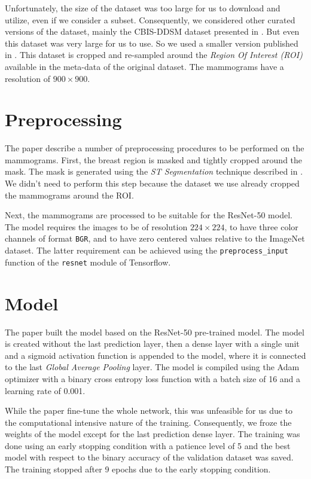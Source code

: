 \documentclass[twocolumn]{article}
\begin{document}
Unfortunately, the size of the dataset was too large for us to download and
utilize, even if we consider a subset. Consequently, we considered other curated
versions of the dataset, mainly the CBIS-DDSM dataset presented in
\autocite{Lee2017}. But even this dataset was very large for us to use. So we
used a smaller version published in \autocite{Luka2020}. This dataset is cropped
and re-sampled around the \emph{Region Of Interest (ROI)} available in the
meta-data of the original dataset. The mammograms have a resolution of $900
\times 900$.

\section{Preprocessing}

The paper describe a number of preprocessing procedures to be performed on the
mammograms. First, the breast region is masked and tightly cropped around the
mask. The mask is generated using the \emph{ST Segmentation} technique described
in \autocite{Pertuz2014}. We didn't need to perform this step because the
dataset we use already cropped the mammograms around the ROI.

Next, the mammograms are processed to be suitable for the ResNet-50 model. The
model requires the images to be of resolution $224 \times 224$, to have three
color channels of format \texttt{BGR}, and to have zero centered values relative
to the ImageNet dataset. The latter requirement can be achieved using the
\texttt{preprocess\_input} function of the \texttt{resnet} module of Tensorflow.

\section{Model}

The paper built the model based on the ResNet-50 pre-trained model. The model is
created without the last prediction layer, then a dense layer with a single unit
and a sigmoid activation function is appended to the model, where it is
connected to the last \emph{Global Average Pooling} layer. The model is compiled
using the Adam optimizer with a binary cross entropy loss function with a batch
size of 16 and a learning rate of 0.001.

While the paper fine-tune the whole network, this was unfeasible for us due to
the computational intensive nature of the training. Consequently, we froze the
weights of the model except for the last prediction dense layer. The training
was done using an early stopping condition with a patience level of 5 and the
best model with respect to the binary accuracy of the validation dataset was
saved. The training stopped after 9 epochs due to the early stopping condition.
\end{document}
